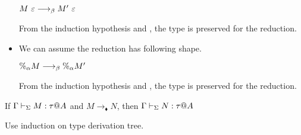 \begin{itemize}
	      $M\ \varepsilon \longrightarrow_{\beta} M'\ \varepsilon$
	      	      	      	      	      	      		      	      	      	      	      
	      From the induction hypothesis and \TIns, the type is preserved for the reduction.
	      	      	      	      	      	      		      	      	      	      	      
	\item \TCsp
	      	      	      	      	      	      		      	      	      	      	      
	      We can assume the reduction has following shape.
	      	      	      	      	      	      		      	      	      	      	      
	      $\%_\alpha M \longrightarrow_{\beta} \%_\alpha M'$
	      	      	      	      	      	      		      	      	      	      	      
	      From the induction hypothesis and \TCsp, the type is preserved for the reduction.
	      	      	      	      	      	      		      	      	      	      	      
	      \fi
	      	      	      	      	      	      		      	      	      	      	      
\end{itemize}

\begin{theorem}
	If $\G\V M:\tau@A$ and $M\longrightarrow_\blacklozenge N$, then $\G\V N:\tau@A$\\
\end{theorem}
	
Use induction on type derivation tree.
	
